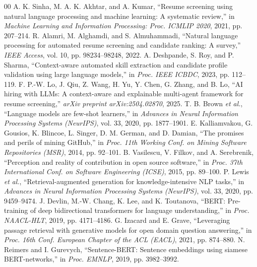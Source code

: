 \documentclass[conference]{IEEEtran}
\begin{document}
\begin{thebibliography}{00}
 A. K. Sinha, M. A. K. Akhtar, and A. Kumar, ``Resume screening using natural language processing and machine learning: A systematic review,'' in \textit{Machine Learning and Information Processing: Proc. ICMLIP 2020}, 2021, pp. 207--214.
 R. Alamri, M. Alghamdi, and S. Almuhammadi, ``Natural language processing for automated resume screening and candidate ranking: A survey,'' \textit{IEEE Access}, vol. 10, pp. 98234--98248, 2022.
 A. Deshpande, S. Roy, and P. Sharma, ``Context-aware automated skill extraction and candidate profile validation using large language models,'' in \textit{Proc. IEEE ICBDC}, 2023, pp. 112--119.
 F. P.-W. Lo, J. Qiu, Z. Wang, H. Yu, Y. Chen, G. Zhang, and B. Lo, ``AI hiring with LLMs: A context-aware and explainable multi-agent framework for resume screening,'' \textit{arXiv preprint arXiv:2504.02870}, 2025.
 T. B. Brown \textit{et al.}, ``Language models are few-shot learners,'' in \textit{Advances in Neural Information Processing Systems (NeurIPS)}, vol. 33, 2020, pp. 1877--1901.
 E. Kalliamvakou, G. Gousios, K. Blincoe, L. Singer, D. M. German, and D. Damian, ``The promises and perils of mining GitHub,'' in \textit{Proc. 11th Working Conf. on Mining Software Repositories (MSR)}, 2014, pp. 92--101.
 B. Vasilescu, V. Filkov, and A. Serebrenik, ``Perception and reality of contribution in open source software,'' in \textit{Proc. 37th International Conf. on Software Engineering (ICSE)}, 2015, pp. 89--100.
 P. Lewis \textit{et al.}, ``Retrieval-augmented generation for knowledge-intensive NLP tasks,'' in \textit{Advances in Neural Information Processing Systems (NeurIPS)}, vol. 33, 2020, pp. 9459--9474.
 J. Devlin, M.-W. Chang, K. Lee, and K. Toutanova, ``BERT: Pre-training of deep bidirectional transformers for language understanding,'' in \textit{Proc. NAACL-HLT}, 2019, pp. 4171--4186.
 G. Izacard and E. Grave, ``Leveraging passage retrieval with generative models for open domain question answering,'' in \textit{Proc. 16th Conf. European Chapter of the ACL (EACL)}, 2021, pp. 874--880.
 N. Reimers and I. Gurevych, ``Sentence-BERT: Sentence embeddings using siamese BERT-networks,'' in \textit{Proc. EMNLP}, 2019, pp. 3982--3992.

\end{thebibliography}
\end{document}
